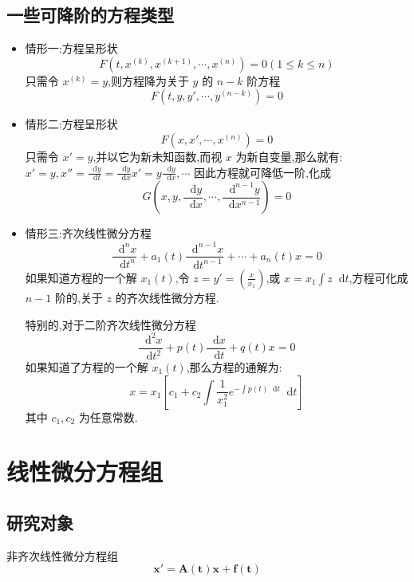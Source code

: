 \documentclass{ctexart}
\newcommand*{\dif}{\mathop{}\!\mathrm{d}}
\numberwithin{equation}{subsection}
\begin{document}
\subsection{一些可降阶的方程类型}
\begin{itemize}
        \item 情形一:方程呈形状
        \begin{equation}
                F(t,x^{(k)},x^{(k+1)},\cdots,x^{(n)})=0(1\leqslant k\leqslant n)
        \end{equation}
        只需令 $x^{(k)}=y$,则方程降为关于 $y$ 的 $n-k$ 阶方程
        \begin{equation}
                F(t,y,y',\cdots,y^{(n-k)})=0
        \end{equation}
        \item 情形二:方程呈形状 
        \begin{equation}
                F(x,x',\cdots,x^{(n)})=0
        \end{equation}
        只需令 $x'=y$,并以它为新未知函数,而视 $x$ 为新自变量,那么就有: $x'=y,x''=\frac{\dif y}{\dif t}=\frac{\dif y}{\dif x}x'=y\frac{\dif y}{\dif x},\cdots$ 因此方程就可降低一阶,化成
        \begin{equation}
                G(x,y,\frac{\dif y}{\dif x},\cdots,\frac{\dif^{n-1}y}{\dif x^{n-1}})=0
        \end{equation}

        \item 情形三:齐次线性微分方程
        \begin{equation}
                \frac{\dif ^nx}{\dif t^n}+a_1(t)\frac{\dif ^{n-1}x}{\dif t^{n-1}}+\cdots+a_n(t)x=0
        \end{equation}
        如果知道方程的一个解 $x_1(t)$,令 $z=y'=(\frac{x}{x_1})$,或 $x=x_1\int z \dif t$,方程可化成 $n-1$ 阶的,关于 $z$ 的齐次线性微分方程.

        特别的,对于二阶齐次线性微分方程
        \[\frac{\dif ^2x}{\dif t^2}+p(t)\frac{\dif x}{\dif t}+q(t)x=0\]
        如果知道了方程的一个解 $x_1(t)$,那么方程的通解为:
        \[x=x_1\left[c_1+c_2\int\frac{1}{x_1^2}e^{-\int p(t)\dif t}\dif t\right]\]
        其中 $c_1,c_2$ 为任意常数.

\end{itemize}




\section{线性微分方程组}
\subsection{研究对象}
非齐次线性微分方程组
\begin{equation}
        \label{eq:一般的一阶线性微分方程组}
        \boldsymbol{x}'=\boldsymbol{A(t)x}+\boldsymbol{f(t)}
\end{equation}
\end{document}
